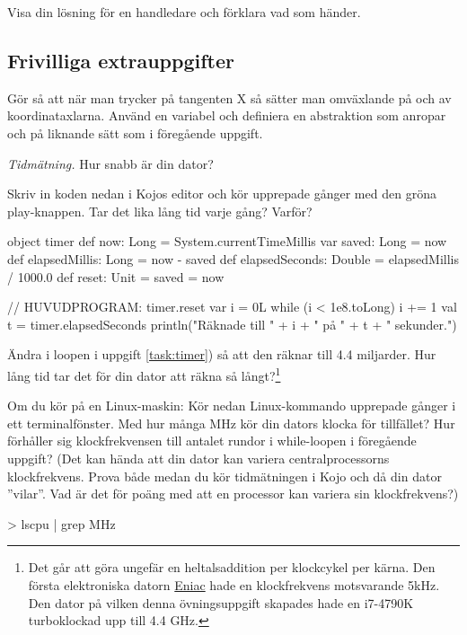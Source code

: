 \Subtask\Checkpoint Visa din lösning för en handledare och förklara vad som händer.

\subsection{Frivilliga extrauppgifter}

\Task Gör så att när man trycker på tangenten X så sätter man omväxlande på och av koordinataxlarna. Använd en variabel  och definiera en abstraktion  som anropar  och  på liknande sätt som i föregående uppgift. 


\Task \label{task:measuretime} \emph{Tidmätning.} Hur snabb är din dator?

\Subtask \label{task:timer} Skriv in koden nedan i Kojos editor och kör upprepade gånger med den gröna play-knappen. Tar det lika lång tid varje gång? Varför?

\begin{Code}
object timer {
  def now: Long = System.currentTimeMillis
  var saved: Long = now
  def elapsedMillis: Long = now - saved
  def elapsedSeconds: Double = elapsedMillis / 1000.0
  def reset: Unit = { saved = now }
}

// HUVUDPROGRAM:
timer.reset
var i = 0L
while (i < 1e8.toLong) { i += 1 }
val t = timer.elapsedSeconds
println("Räknade till " + i + " på " + t + " sekunder.")
\end{Code}


\Subtask Ändra i loopen i uppgift \ref{task:timer}) så att den räknar till 4.4 miljarder. Hur lång tid tar det för din dator att räkna så långt?\footnote{Det går att göra ungefär en heltalsaddition per klockcykel per kärna. Den första elektroniska datorn \href{https://sv.wikipedia.org/wiki/ENIAC}{Eniac} hade en klockfrekvens motsvarande 5kHz. Den dator på vilken denna övningsuppgift skapades hade en i7-4790K turboklockad upp till 4.4 GHz.
}

\Subtask  Om du kör på en Linux-maskin: Kör nedan Linux-kommando upprepade gånger i ett terminalfönster. Med hur många MHz kör din dators klocka för tillfället? Hur förhåller sig klockfrekvensen till antalet rundor i while-loopen i föregående uppgift? (Det kan hända att din dator kan variera centralprocessorns klockfrekvens. Prova både medan du kör tidmätningen i Kojo och då din dator ''vilar''. Vad är det för poäng med att en processor kan variera sin klockfrekvens?)
\begin{REPLnonum}
> lscpu | grep MHz
\end{REPLnonum}


